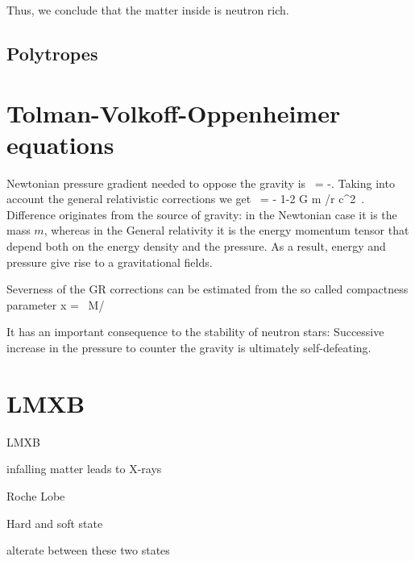 Thus, we conclude that the matter inside is neutron rich.


\subsection{Polytropes}



\section{Tolman-Volkoff-Oppenheimer equations}
Newtonian pressure gradient needed to oppose the gravity is
\be
{} = -.
\ee
Taking into account the general relativistic corrections we get
\be
{} = 
    - \times 
    {1-2 G m /r c^2 }.
\ee
Difference originates from the source of gravity:
in the Newtonian case it is the mass $m$, whereas in the General relativity it is the energy momentum tensor that depend both on the energy density and the pressure.
As a result, energy and pressure give rise to a gravitational fields.

Severness of the GR corrections can be estimated from the so called compactness parameter
\be
x =  ~M/\Msun \km
\ee


It has an important consequence to the stability of neutron stars:
Successive increase in the pressure to counter the gravity is ultimately self-defeating.






\section{LMXB}

LMXB \cite{TH06}

infalling matter leads to X-rays \cite{Lewin93}

Roche Lobe \cite{PRP02} \cite{LL15}

Hard and soft state \cite{HvdK89}

alterate between these two states \cite{MDF14} \cite{DGK07}










